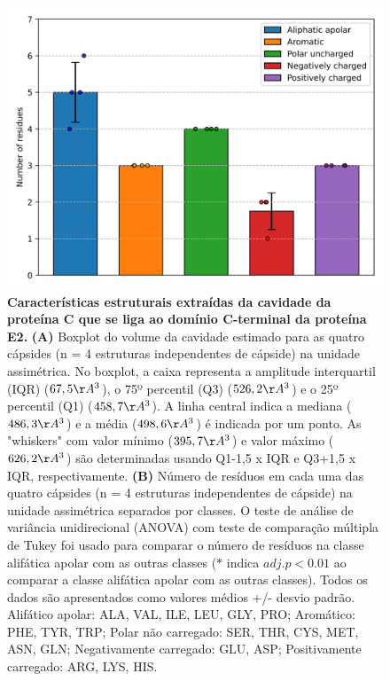\documentclass[Portugues]{phdquali}
\begin{document}
\begin{figure}
    \includegraphics[scale=0.5]{images/mayv-c-e2-res-dist.png}
  \caption[Características estruturais extraídas da cavidade da proteína C que se liga ao domínio C-terminal da proteína E2]{\textbf{Características estruturais extraídas da cavidade da proteína C que se liga ao domínio C-terminal da proteína E2.} \textbf{(A)} Boxplot do volume da cavidade estimado para as quatro cápsides (n = 4 estruturas independentes de cápside) na unidade assimétrica. No boxplot, a caixa representa a amplitude interquartil (IQR) ($67,5 \AA^3$), o 75º percentil (Q3) ($526,2 \AA^3$) e o 25º percentil (Q1) ($458,7 \AA^3$). A linha central indica a mediana ($486,3 \AA^3$) e a média ($498,6 \AA^3$) é indicada por um ponto. As "whiskers" com valor mínimo ($395,7 \AA^3$) e valor máximo ($626,2 \AA^3$) são determinadas usando Q1-1,5 x IQR e Q3+1,5 x IQR, respectivamente. \textbf{(B)} Número de resíduos em cada uma das quatro cápsides (n = 4 estruturas independentes de cápside) na unidade assimétrica separados por classes. O teste de análise de variância unidirecional (ANOVA) com teste de comparação múltipla de Tukey foi usado para comparar o número de resíduos na classe alifática apolar com as outras classes ($*$ indica $adj. p<0.01$ ao comparar a classe alifática apolar com as outras classes). Todos os dados são apresentados como valores médios +/- desvio padrão. Alifático apolar: ALA, VAL, ILE, LEU, GLY, PRO; Aromático: PHE, TYR, TRP; Polar não carregado: SER, THR, CYS, MET, ASN, GLN; Negativamente carregado: GLU, ASP; Positivamente carregado: ARG, LYS, HIS.}
  \label{fig:mayv-c-e2-plots}
\end{figure}
\end{document}
